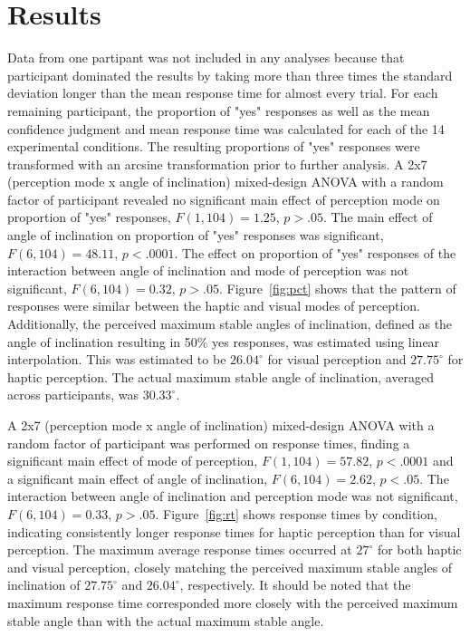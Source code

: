 \documentclass{article}
\begin{document}
\section{Results}
Data from one partipant was not included in any analyses because that participant dominated the results by taking more than three times the standard deviation longer than the mean response time for almost every trial. For each remaining participant, the proportion of "yes" responses as well as the mean confidence judgment and mean response time was calculated for each of the 14 experimental conditions.  The resulting proportions of "yes" responses were transformed with an arcsine transformation prior to further analysis. A 2x7 (perception mode x angle of inclination) mixed-design ANOVA with a random factor of participant revealed no significant main effect of perception mode on proportion of "yes" responses, $F(1, 104) = 1.25$, $p > .05$. The main effect of angle of inclination on proportion of "yes" responses was significant, $F(6, 104) = 48.11$, $p < .0001$. The effect on proportion of "yes" responses of the interaction between angle of inclination and mode of perception was not significant, $F(6, 104) = 0.32$, $p > .05$. Figure~\ref{fig:pct} shows that the pattern of responses were similar between the haptic and visual modes of perception. Additionally, the perceived maximum stable angles of inclination, defined as the angle of inclination resulting in 50\% yes responses, was estimated using linear interpolation. This was estimated to be $26.04^\circ$ for visual perception and $27.75^\circ$ for haptic perception. The actual maximum stable angle of inclination, averaged across participants, was $30.33^\circ$.

A 2x7 (perception mode x angle of inclination) mixed-design ANOVA with a random factor of participant was performed on response times, finding a significant main effect of mode of perception, $F(1, 104) = 57.82$, $p<.0001$ and a significant main effect of angle of inclination, $F(6, 104) = 2.62$, $p < .05$. The interaction between angle of inclination and perception mode was not significant, $F(6, 104) = 0.33$, $p > .05$. Figure~\ref{fig:rt} shows response times by condition, indicating consistently longer response times for haptic perception than for visual perception. The maximum average response times occurred at $27^\circ$ for both haptic and visual perception, closely matching the perceived maximum stable angles of inclination of $27.75^\circ$ and $26.04^\circ$, respectively. It should be noted that the maximum response time corresponded more closely with the perceived maximum stable angle than with the actual maximum stable angle.
\end{document}
